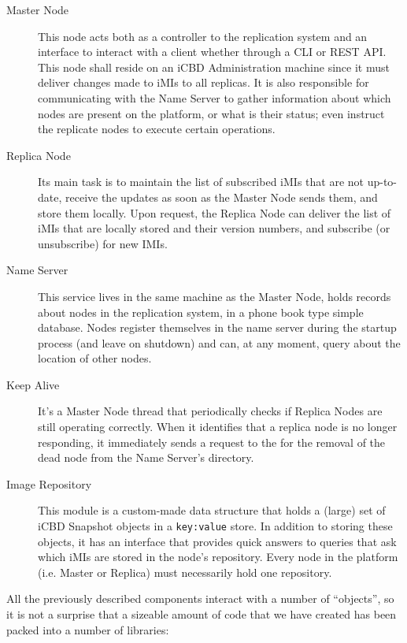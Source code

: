 \begin{description}
	\item [Master Node] This node acts both as a controller to the replication system and an interface to interact with a client whether through a CLI or REST API. This node shall reside on an iCBD Administration machine since it must deliver changes made to iMIs to all replicas. It is also responsible for communicating with the Name Server to gather information about which nodes are present on the platform, or what is their status; even instruct the replicate nodes to execute certain operations.
	\item [Replica Node] Its main task is to maintain the list of subscribed iMIs that are not up-to-date, receive the updates as soon as the Master Node sends them, and store them locally. Upon request, the Replica Node can deliver the list of iMIs that are locally stored and their version numbers, and subscribe (or unsubscribe) for new IMIs.
	\item [Name Server] This service lives in the same machine as the Master Node, holds records about nodes in the replication system, in a phone book type simple database. Nodes register themselves in the name server during the startup process (and leave on shutdown) and can, at any moment, query about the location of other nodes.
	\item [Keep Alive] It's a Master Node thread that periodically checks if Replica Nodes are still operating correctly. When it identifies that a replica node is no longer responding, it immediately sends a request to the for the removal of the dead node from the Name Server’s directory.
	\item [Image Repository] This module is a custom-made data structure that holds a (large) set of iCBD Snapshot objects in a \texttt{key:value} store. In addition to storing these objects, it has an interface that provides quick answers to queries that ask which iMIs are stored in the node’s repository. Every node in the platform (i.e. Master or Replica) must necessarily hold one repository.
\end{description}



All the previously described components interact with a number of “objects”, so it is not a surprise that a sizeable amount of code that we have created has been packed into a number of libraries:

